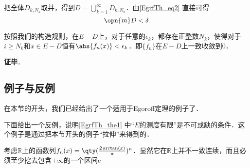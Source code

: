 把全体$D_{k, N_k}$取并，得到$D=\bigcup_{k=1}^\infty D_{k, N_k}$．由\autoref{EgrfTh_eq2} 直接可得
\begin{equation}
\opn{m}D<\delta
\end{equation}

按照我们的构造规则，在$E-D$上，对于任意的$\epsilon_k$，都存在正整数$N_k$，使得对于$i\geq N_k$和$x\in E-D$恒有$\abs{f_n(x)}<\epsilon_k$．即$\{f_n\}$在$E-D$上一致收敛到$0$．

\textbf{证毕}．


\subsection{例子与反例}

在本节的开头，我们已经给出了一个适用于Egoroff定理的例子了．

下面给出一个反例，说明\autoref{EgrfTh_the1} 中“$E$的测度有限”是不可或缺的条件．这个例子是通过把本节开头的例子“拉伸”来得到的．


\begin{example}{}

考虑$\mathbb{R}$上的函数列$f_n(x)=\qty(\frac{2\arctan(x)}{\pi})^n$．显然它在$\mathbb{R}$上并不一致连续，而且必须至少挖去包含$+\infty$的一个区间c

\end{example}















